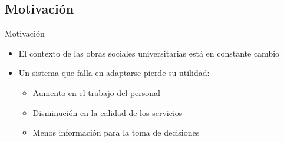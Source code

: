 \documentclass[10pt]{beamer}
\begin{document}
\subsection{Motivación}

\begin{frame}{Motivación}
    \begin{itemize}
        \item El contexto de las obras sociales universitarias está en constante cambio
        \item Un sistema que falla en adaptarse pierde su utilidad:
        \begin{itemize}
            \item Aumento en el trabajo del personal
            \item Disminución en la calidad de los servicios
            \item Menos información para la toma de decisiones
        \end{itemize}
    \end{itemize}
\end{frame}

\end{document}
